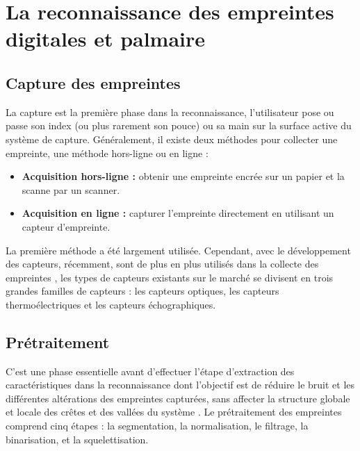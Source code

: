 \chapter{La reconnaissance des empreintes digitales et palmaire} %

\label{Appendix1} %


\section{Capture des empreintes}
La capture est la première phase dans la reconnaissance, l’utilisateur pose ou passe son index (ou plus rarement son pouce) ou sa main sur la surface active du système de capture. Généralement, il existe deux méthodes pour collecter une empreinte, une méthode hors-ligne ou en ligne :
\begin{itemize}
	\item \textbf{Acquisition hors-ligne :} obtenir une empreinte encrée sur un papier et la scanne par un scanner.
	\item \textbf{Acquisition en ligne :} capturer l'empreinte  directement en utilisant un capteur d'empreinte.
\end{itemize}
La première méthode a été largement utilisée. Cependant, avec le développement des capteurs, récemment, sont de plus en plus utilisés dans la collecte des empreintes \citep{Bhanu2004}, les types de capteurs existants sur le marché se divisent en trois grandes familles de capteurs : les capteurs optiques, les capteurs thermoélectriques et les capteurs échographiques.
\section{Prétraitement}
\label{pretrait}
C’est une phase essentielle avant d’effectuer l’étape d’extraction des caractéristiques dans la reconnaissance dont l’objectif est de réduire le bruit et les différentes altérations des empreintes capturées, sans affecter la structure globale et locale des crêtes et des vallées du système  \citep{hong1998integrating}. Le prétraitement des empreintes comprend cinq étapes : la segmentation, la normalisation, le filtrage, la binarisation, et la squelettisation. 

